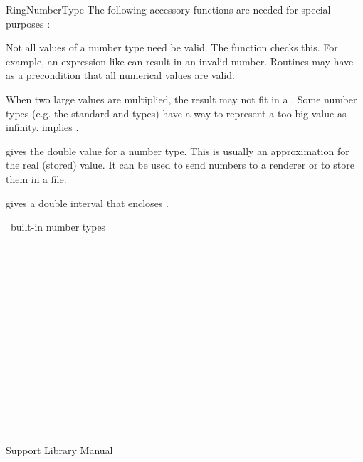 \begin{ccRefConcept}{RingNumberType}
The following accessory functions are needed for special purposes :

{Not all values of a number type need be valid. The function
 checks this. For example, an expression like
 can result in an invalid number. Routines may
have as a precondition that all numerical values are valid.}

{ When two large values are multiplied, the result may not fit in a
  . 
  Some number types (e.g. the standard  and  types)
  have a way to represent a too big value as infinity.
   implies .}

         {gives the double value for a number type.
          This is usually an approximation for the real (stored) value.
          It can be used to send numbers to a renderer or to store them 
          in a file.}

         {gives a double interval that encloses .}

\ccHasModels

\CC\ built-in number types \\
 \\
 \\
 \\
 \\
 \\
 \\
 \\
 \\
 \\
 \\
 \\
 \\

\ccSeeAlso
{} \\
 \\
 \\
Support Library Manual

\end{ccRefConcept}
